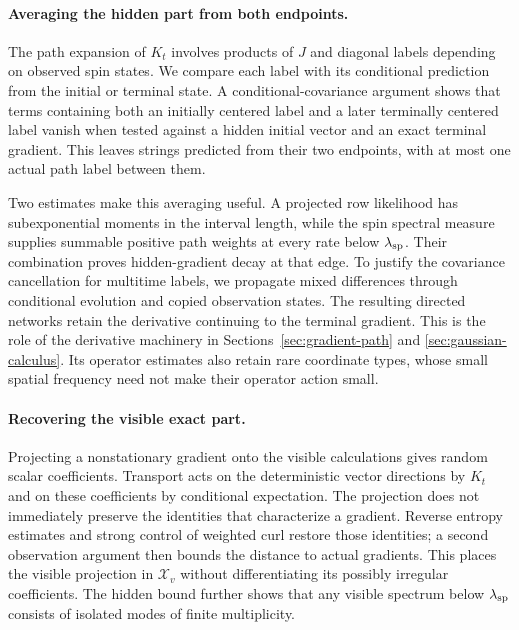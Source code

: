 \paragraph{Averaging the hidden part from both endpoints.}
The path expansion of \(K_t\) involves products of \(J\) and diagonal
labels depending on observed spin states. We compare each label with
its conditional prediction from the initial or terminal state. A
conditional-covariance argument shows that terms containing both an
initially centered label and a later terminally centered label vanish
when tested against a hidden initial vector and an exact terminal
gradient. This leaves strings predicted from their two endpoints, with
at most one actual path label between them.

Two estimates make this averaging useful. A projected row likelihood
has subexponential moments in the interval length, while the spin
spectral measure supplies summable positive path weights at every rate
below \(\lambda_{\rm sp}\). Their combination proves hidden-gradient
decay at that edge. To justify the covariance cancellation for multitime
labels, we propagate mixed differences through conditional evolution and
copied observation states. The resulting directed networks retain the
derivative continuing to the terminal gradient. This is the role of the
derivative machinery in Sections~\ref{sec:gradient-path} and
\ref{sec:gaussian-calculus}. Its operator estimates also retain rare
coordinate types, whose small spatial frequency need not make their
operator action small.

\paragraph{Recovering the visible exact part.}
Projecting a nonstationary gradient onto the visible calculations gives
random scalar coefficients. Transport acts on the deterministic vector
directions by \(K_t\) and on these coefficients by conditional
expectation. The projection does not immediately preserve the identities
that characterize a gradient. Reverse entropy estimates and strong
control of weighted curl restore those identities; a second observation
argument then bounds the distance to actual gradients. This places the
visible projection in \(\mathcal X_v\) without differentiating its
possibly irregular coefficients. The hidden bound further shows that
any visible spectrum below \(\lambda_{\rm sp}\) consists of isolated
modes of finite multiplicity.

